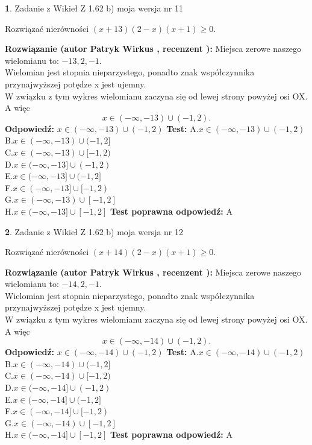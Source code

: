 \documentclass[12pt, a4paper]{article}
\theoremstyle{definition} %
\newtheorem{zad}{}
\newcommand{\zadStart}[1]{\begin{zad}#1\newline}
\newcommand{\zadStop}{\end{zad}}
\newcommand{\rozwStart}[2]{\noindent \textbf{Rozwiązanie (autor #1 , recenzent #2): }\newline}
\newcommand{\rozwStop}{\newline}
\newcommand{\odpStart}{\noindent \textbf{Odpowiedź:}\newline}
\newcommand{\odpStop}{\newline}
\newcommand{\testStart}{\noindent \textbf{Test:}\newline}
\newcommand{\testStop}{\newline}
\newcommand{\kluczStart}{\noindent \textbf{Test poprawna odpowiedź:}\newline}
\newcommand{\kluczStop}{\newline}
\begin{document}
\zadStart{Zadanie z Wikieł Z 1.62 b) moja wersja nr 11}

Rozwiązać nierówności $(x+13)(2-x)(x+1)\ge0$.
\zadStop
\rozwStart{Patryk Wirkus}{}
Miejsca zerowe naszego wielomianu to: $-13, 2, -1$.\\
Wielomian jest stopnia nieparzystego, ponadto znak współczynnika przy\linebreak najwyższej potędze x jest ujemny.\\ W związku z tym wykres wielomianu zaczyna się od lewej strony powyżej osi OX. A więc $$x \in (-\infty,-13) \cup (-1,2).$$
\rozwStop
\odpStart
$x \in (-\infty,-13) \cup (-1,2)$
\odpStop
\testStart
A.$x \in (-\infty,-13) \cup (-1,2)$\\
B.$x \in (-\infty,-13) \cup (-1,2]$\\
C.$x \in (-\infty,-13) \cup [-1,2)$\\
D.$x \in (-\infty,-13] \cup (-1,2)$\\
E.$x \in (-\infty,-13] \cup (-1,2]$\\
F.$x \in (-\infty,-13] \cup [-1,2)$\\
G.$x \in (-\infty,-13) \cup [-1,2]$\\
H.$x \in (-\infty,-13] \cup [-1,2]$
\testStop
\kluczStart
A
\kluczStop



\zadStart{Zadanie z Wikieł Z 1.62 b) moja wersja nr 12}

Rozwiązać nierówności $(x+14)(2-x)(x+1)\ge0$.
\zadStop
\rozwStart{Patryk Wirkus}{}
Miejsca zerowe naszego wielomianu to: $-14, 2, -1$.\\
Wielomian jest stopnia nieparzystego, ponadto znak współczynnika przy\linebreak najwyższej potędze x jest ujemny.\\ W związku z tym wykres wielomianu zaczyna się od lewej strony powyżej osi OX. A więc $$x \in (-\infty,-14) \cup (-1,2).$$
\rozwStop
\odpStart
$x \in (-\infty,-14) \cup (-1,2)$
\odpStop
\testStart
A.$x \in (-\infty,-14) \cup (-1,2)$\\
B.$x \in (-\infty,-14) \cup (-1,2]$\\
C.$x \in (-\infty,-14) \cup [-1,2)$\\
D.$x \in (-\infty,-14] \cup (-1,2)$\\
E.$x \in (-\infty,-14] \cup (-1,2]$\\
F.$x \in (-\infty,-14] \cup [-1,2)$\\
G.$x \in (-\infty,-14) \cup [-1,2]$\\
H.$x \in (-\infty,-14] \cup [-1,2]$
\testStop
\kluczStart
A
\kluczStop
\end{document}
